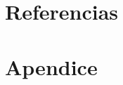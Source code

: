 \documentclass[a4paper,11pt]{book}
\theoremstyle{definition}
\begin{document}
%
%
%
%
%
%
%
%
%
%





\chapter{Referencias}




\chapter{Apendice} \label{app:technical}
\end{document}
